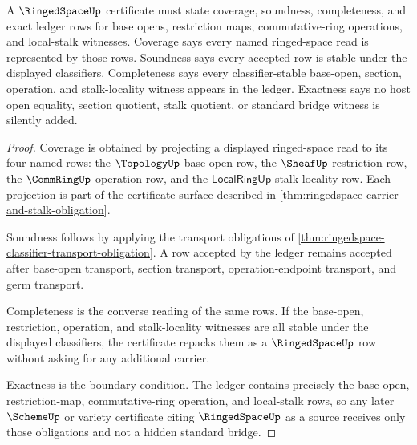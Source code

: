 \begin{theorem}\label{thm:ringedspace-exact-ledger-obligation}
A $\RingedSpaceUp$ certificate must state coverage, soundness, completeness, and exact ledger rows for base opens, restriction maps, commutative-ring operations, and local-stalk witnesses. Coverage says every named ringed-space read is represented by those rows. Soundness says every accepted row is stable under the displayed classifiers. Completeness says every classifier-stable base-open, section, operation, and stalk-locality witness appears in the ledger. Exactness says no host open equality, section quotient, stalk quotient, or standard bridge witness is silently added.
\end{theorem}
\begin{proof}
Coverage is obtained by projecting a displayed ringed-space read to its four named rows: the $\TopologyUp$ base-open row, the $\SheafUp$ restriction row, the $\CommRingUp$ operation row, and the $\mathsf{LocalRingUp}$ stalk-locality row. Each projection is part of the certificate surface described in \autoref{thm:ringedspace-carrier-and-stalk-obligation}.

Soundness follows by applying the transport obligations of \autoref{thm:ringedspace-classifier-transport-obligation}. A row accepted by the ledger remains accepted after base-open transport, section transport, operation-endpoint transport, and germ transport.

Completeness is the converse reading of the same rows. If the base-open, restriction, operation, and stalk-locality witnesses are all stable under the displayed classifiers, the certificate repacks them as a $\RingedSpaceUp$ row without asking for any additional carrier.

Exactness is the boundary condition. The ledger contains precisely the base-open, restriction-map, commutative-ring operation, and local-stalk rows, so any later $\SchemeUp$ or variety certificate citing $\RingedSpaceUp$ as a source receives only those obligations and not a hidden standard bridge.
\end{proof}

